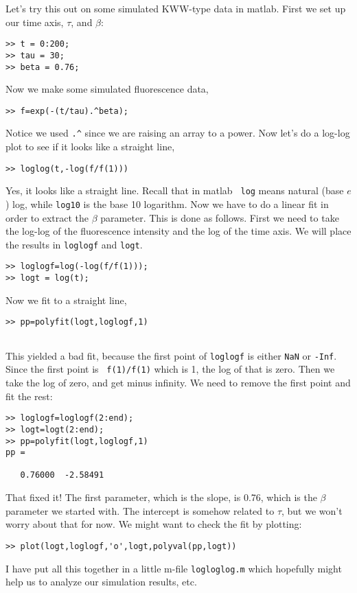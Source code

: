 \documentclass[12pt]{article}
\begin{document}
Let's try this out on some simulated KWW-type data in {\sc matlab}.
First we set up our time axis, $\tau$, and $\beta$:
%
\begin{verbatim}
>> t = 0:200;
>> tau = 30;
>> beta = 0.76;
\end{verbatim}
%
Now we make some simulated fluorescence data,
%
\begin{verbatim}
>> f=exp(-(t/tau).^beta);
\end{verbatim}
%
Notice we used \verb=.^= since we are raising an array to a power.
Now let's do a log-log plot to see if it looks like a straight line,
%
\begin{verbatim}
>> loglog(t,-log(f/f(1)))
\end{verbatim}
%
Yes, it looks like a straight line.  Recall that in {\sc matlab} {\tt
log} means natural (base $e$) log, while {\tt log10} is the base 10
logarithm.  Now we have to do a linear fit in
order to extract the $\beta$ parameter.  This is done as follows.
First we need to take the log-log of the fluorescence intensity and
the log of the time axis.  We will place the results in {\tt loglogf}
and {\tt logt}.
%
\begin{verbatim}
>> loglogf=log(-log(f/f(1)));
>> logt = log(t);
\end{verbatim}
%
Now we fit to a straight line,
%
\begin{verbatim}
>> pp=polyfit(logt,loglogf,1)


\end{verbatim}
% 
This yielded a bad fit, because the first point of {\tt loglogf} is
either {\tt NaN} or {\tt -Inf}.  Since the first point is {\tt
f(1)/f(1)} which is 1, the log of that is zero.  Then we take the log
of zero, and get minus infinity.  We need to remove the first point and
fit the rest:
%
\begin{verbatim}
>> loglogf=loglogf(2:end);
>> logt=logt(2:end);
>> pp=polyfit(logt,loglogf,1)
pp =

   0.76000  -2.58491

\end{verbatim}
%
That fixed it!  The first parameter, which is the slope, is 0.76, which is the
$\beta$ parameter we started with.  The intercept is somehow related
to $\tau$, but we won't worry about that for now.  We might want to
check the fit by plotting:
\begin{verbatim}
>> plot(logt,loglogf,'o',logt,polyval(pp,logt))
\end{verbatim}
%
I have put all this together in a little m-file {\tt logloglog.m}
which hopefully might help us to analyze our simulation results, etc.
\end{document}
